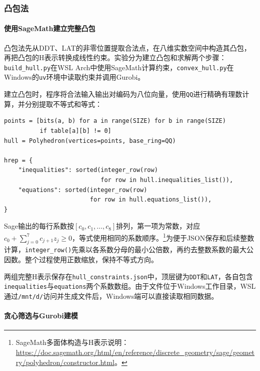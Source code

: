 \clearpage
\subsubsection{凸包法}
\label{subsubsec:lab4-task1-convex-hull}

\paragraph{使用SageMath建立完整凸包}

凸包法先从DDT、LAT的非零位置提取合法点，在八维实数空间中构造其凸包，再把凸包的H表示转换成线性约束。实验分为建立凸包和求解两个步骤：\texttt{build\_hull.py}在WSL Arch中使用SageMath计算约束，\texttt{convex\_hull.py}在Windows的\texttt{uv}环境中读取约束并调用Gurobi。

建立凸包时，程序将合法输入输出对编码为八位向量，使用\texttt{QQ}进行精确有理数计算，并分别提取不等式和等式：
\begin{lstlisting}
points = [bits(a, b) for a in range(SIZE) for b in range(SIZE)
          if table[a][b] != 0]
hull = Polyhedron(vertices=points, base_ring=QQ)

hrep = {
    "inequalities": sorted(integer_row(row)
                           for row in hull.inequalities_list()),
    "equations": sorted(integer_row(row)
                        for row in hull.equations_list()),
}
\end{lstlisting}

Sage输出的每行系数按$[c_0,c_1,\ldots,c_8]$排列，第一项为常数，对应$c_0+\sum_{j=0}^{7}c_{j+1}z_j\ge0$，等式使用相同的系数顺序。\footnote{SageMath多面体构造与H表示说明：\url{https://doc.sagemath.org/html/en/reference/discrete_geometry/sage/geometry/polyhedron/constructor.html}。}为便于JSON保存和后续整数计算，\texttt{integer\_row()}先乘以各系数分母的最小公倍数，再约去整数系数的最大公因数。整个过程使用正数缩放，保持不等式方向。

两组完整H表示保存在\texttt{hull\_constraints.json}中，顶层键为\texttt{DDT}和\texttt{LAT}，各自包含\texttt{inequalities}与\texttt{equations}两个系数数组。由于文件位于Windows工作目录，WSL通过\texttt{/mnt/d/}访问并生成文件后，Windows端可以直接读取相同数据。

\paragraph{贪心筛选与Gurobi建模}

